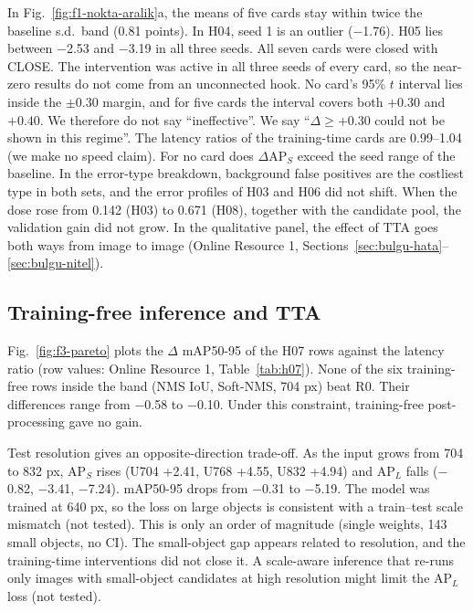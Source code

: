 \documentclass[pdflatex,iicol,sn-mathphys-num]{sn-jnl}
\begin{document}


In Fig.~\ref{fig:f1-nokta-aralik}a, the means of five cards stay within twice the baseline s.d.\ band (0.81 points). In H04, seed 1 is an outlier ($-$1.76). H05 lies between $-$2.53 and $-$3.19 in all three seeds. All seven cards were closed with CLOSE. The intervention was active in all three seeds of every card, so the near-zero results do not come from an unconnected hook. No card's 95\% $t$ interval lies inside the $\pm$0.30 margin, and for five cards the interval covers both $+0.30$ and $+0.40$. We therefore do not say ``ineffective''. We say ``$\Delta\ge+0.30$ could not be shown in this regime''. The latency ratios of the training-time cards are 0.99--1.04 (we make no speed claim). For no card does $\Delta$AP$_S$ exceed the seed range of the baseline. In the error-type breakdown, background false positives are the costliest type in both sets, and the error profiles of H03 and H06 did not shift. When the dose rose from 0.142 (H03) to 0.671 (H08), together with the candidate pool, the validation gain did not grow. In the qualitative panel, the effect of TTA goes both ways from image to image (Online Resource 1, Sections~\ref{sec:bulgu-hata}--\ref{sec:bulgu-nitel}).



\subsection{Training-free inference and TTA}\label{sec:bulgu-gecikme}
Fig.~\ref{fig:f3-pareto} plots the $\Delta$ mAP50-95 of the H07 rows against the latency ratio (row values: Online Resource 1, Table~\ref{tab:h07}). None of the six training-free rows inside the band (NMS IoU, Soft-NMS, 704 px) beat R0. Their differences range from $-$0.58 to $-$0.10. Under this constraint, training-free post-processing gave no gain.

Test resolution gives an opposite-direction trade-off. As the input grows from 704 to 832 px, AP$_S$ rises (U704 +2.41, U768 +4.55, U832 +4.94) and AP$_L$ falls ($-$0.82, $-$3.41, $-$7.24). mAP50-95 drops from $-$0.31 to $-$5.19. The model was trained at 640 px, so the loss on large objects is consistent with a train--test scale mismatch (not tested). This is only an order of magnitude (single weights, 143 small objects, no CI). The small-object gap appears related to resolution, and the training-time interventions did not close it. A scale-aware inference that re-runs only images with small-object candidates at high resolution might limit the AP$_L$ loss (not tested).
\end{document}
